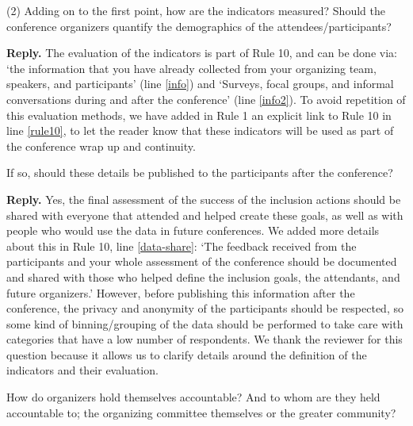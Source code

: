 \documentclass{article}
\newenvironment{Reply}{\noindent\color{BlueViolet}\textbf{Reply.}}{\vspace{1em}}
\begin{document}
(2) Adding on to the first point, how are the indicators measured? Should the conference organizers quantify the demographics of the attendees/participants? 

\begin{Reply}
The evaluation of the indicators is part of Rule 10, and can be done via: 
`the information that you have already collected from your organizing team, speakers, and participants' (line \ref{info}) and `Surveys, focal groups, and informal conversations during and after the conference' (line \ref{info2}). 
To avoid repetition of this evaluation methods, we have added in Rule 1 an explicit link to Rule 10 in line \ref{rule10}, to let the reader know that these indicators will be used as part of the conference wrap up and continuity. 
\end{Reply}

If so, should these details be published to the participants after the conference? 

\begin{Reply}
Yes, the final assessment of the success of the inclusion actions should be shared with everyone that attended and helped create these goals, as well as with people who would use the data in future conferences. We added more details about this in Rule 10, line \ref{data-share}:
`The feedback received from the participants and your whole assessment of the conference should be documented and shared with those who helped define the inclusion goals, the attendants, and future organizers.' 
However, before publishing this information after the conference, the privacy and anonymity of the participants should be respected, so some kind of binning/grouping of the data should be performed to take care with categories that have a low number of respondents. %
We thank the reviewer for this question because it allows us to clarify details around the definition of the indicators and their evaluation. 
\end{Reply}

How do organizers hold themselves accountable? And to whom are they held accountable to; the organizing committee themselves or the greater community?
\end{document}
